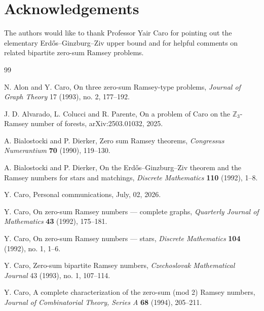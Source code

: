 ﻿\documentclass[11pt]{article}
\numberwithin{equation}{section}
\theoremstyle{remark}
\begin{document}
\section*{Acknowledgements}

The authors would like to thank Professor Yair Caro for pointing out the elementary Erd\H{o}s--Ginzburg--Ziv upper bound and for helpful comments on related bipartite zero-sum Ramsey problems.



\begin{thebibliography}{99}

    N. Alon and Y. Caro,
    \newblock On three zero-sum Ramsey-type problems,
    \newblock \emph{Journal of Graph Theory} 17 (1993), no. 2, 177--192.

    J. D. Alvarado, L. Colucci and R. Parente,
    \newblock On a problem of Caro on the \(\mathbb Z_3\)-Ramsey number of forests,
    \newblock arXiv:2503.01032, 2025.

    A. Bialostocki and P. Dierker,
    \newblock Zero sum Ramsey theorems,
    \newblock \emph{Congressus Numerantium} \textbf{70} (1990), 119--130.

    A. Bialostocki and P. Dierker,
    \newblock On the Erd\H{o}s--Ginzburg--Ziv theorem and the Ramsey numbers for stars and matchings,
    \newblock \emph{Discrete Mathematics} \textbf{110} (1992), 1--8.

    Y. Caro,
    \newblock Personal communications, July, 02, 2026.

    Y. Caro,
    \newblock On zero-sum Ramsey numbers --- complete graphs,
    \newblock \emph{Quarterly Journal of Mathematics} \textbf{43} (1992),
    175--181.

    Y. Caro,
    \newblock On zero-sum Ramsey numbers --- stars,
    \newblock \emph{Discrete Mathematics} \textbf{104} (1992), no. 1, 1--6.

        Y. Caro,
        \newblock Zero-sum bipartite Ramsey numbers,
        \newblock \emph{Czechoslovak Mathematical Journal} 43 (1993), no. 1, 107--114.

    Y. Caro,
    \newblock A complete characterization of the zero-sum (mod 2) Ramsey numbers,
    \newblock \emph{Journal of Combinatorial Theory, Series A} \textbf{68} (1994), 205--211.


\end{thebibliography}
\end{document}
